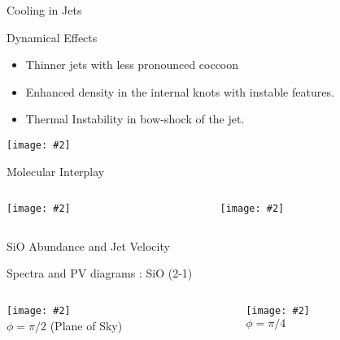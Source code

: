 \documentclass[8pt,xcolor=dvipsnames]{beamer}
\newcommand{\figpath}{./NEWFIGS/}
\newcommand{\spic}[2]{\texttt{[image: \#2]}}
\begin{document}
\begin{frame}{Cooling in Jets}
\begin{block}{Dynamical Effects}
\centering
\begin{itemize}
\item Thinner jets with less pronounced coccoon
\item Enhanced density in the internal knots with instable features.
\item Thermal Instability in bow-shock of the jet. 
\end{itemize}
\end{block}
\centering
\spic{0.23}{\figpath/pfig4.pdf}

\end{frame}

\begin{frame}{Molecular Interplay}
\begin{columns}
\begin{column}{0.4\textwidth}
\spic{0.2}{\figpath/pfig6.pdf}
\end{column}
\hfill
\begin{column}{0.6\textwidth}
\spic{0.2}{\figpath/pfig7.pdf}
\end{column}
\end{columns}
\end{frame}



\begin{frame}{SiO Abundance and Jet Velocity}
\end{frame}

\begin{frame}{Spectra and PV diagrams : SiO (2-1)}
\begin{columns}
\begin{column}{0.48\textwidth}
\spic{0.17}{\figpath/pfig8.pdf}\\
\hspace{0.2cm} $\phi = \pi/2$ (Plane of Sky)
\end{column}
\hfill
\begin{column}{0.48\textwidth}
\spic{0.17}{\figpath/pfig9.pdf}\\
\hspace{0.2cm}$\phi = \pi/4$ 
\end{column}
\end{columns}
\end{frame}
\end{document}
